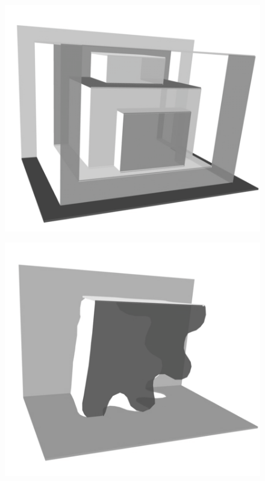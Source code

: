 \begin{figure}[htbp]
\centering
\includegraphics{figures/92_Appendix_Visual_Aids_Materials/still_card1.png}
\caption{}
\end{figure}

\begin{figure}[htbp]
\centering
\includegraphics{figures/92_Appendix_Visual_Aids_Materials/still_card2.png}
\caption{}
\end{figure}

